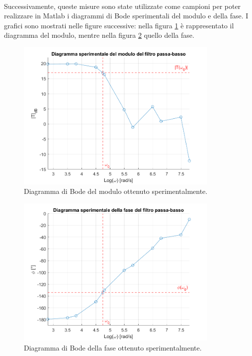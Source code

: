 \documentclass{report}
\begin{document}
\\Successivamente, queste misure sono state utilizzate come campioni per poter realizzare in Matlab i diagrammi di Bode sperimentali del modulo e della fase. I grafici sono mostrati nelle figure successive: nella figura \ref{figura:modulosperimentale} è rappresentato il diagramma del modulo, mentre nella figura \ref{figura:fasesperimentale} quello della fase. \par %
\begin{figure}[h!]
	\centering
	\includegraphics[height=7.3cm]{immagini/modulo_sper}
	\caption{Diagramma di Bode del modulo ottenuto sperimentalmente.}
	\label{figura:modulosperimentale}
\end{figure}
\begin{figure}[h!]
	\centering
	\includegraphics[height=7.3cm]{immagini/fase_sper}
	\caption{Diagramma di Bode della fase ottenuto sperimentalmente.}
	\label{figura:fasesperimentale}
\end{figure}
\end{document}
